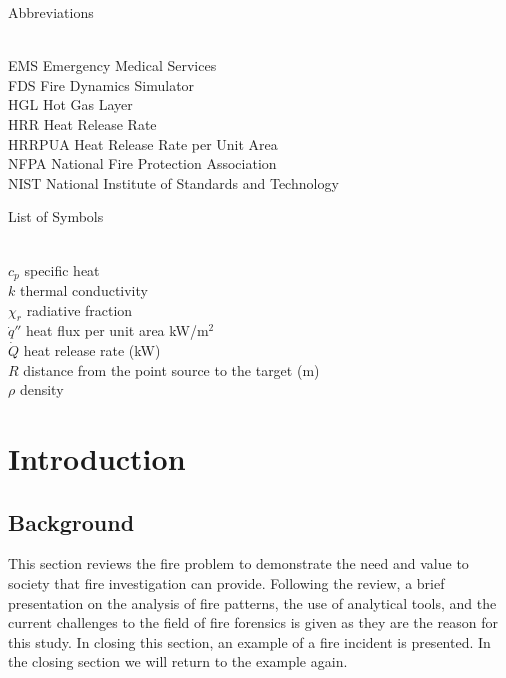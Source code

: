 \documentclass[twoside]{uocthesis}
\begin{document}
\clearpage
Abbreviations
\begin{tabbing}
\hspace{1.5in} \= \\
EMS \> Emergency Medical Services \\
FDS \> Fire Dynamics Simulator \\
HGL \> Hot Gas Layer \\
HRR \> Heat Release Rate \\
HRRPUA \> Heat Release Rate per Unit Area \\
NFPA \> National Fire Protection Association  \\
NIST \> National Institute of Standards and Technology \\
\end{tabbing}

List of Symbols
\begin{tabbing}
\hspace{1.5in} \= \\
$c_{p}$ \> specific heat \\
$k$ \> thermal conductivity \\
$\chi_r$ \> radiative fraction \\
$\dot{q}''$ \> heat flux per unit area kW/m$^2$ \\
$\dot{Q}$ \> heat release rate (kW) \\ 
$R$ \> distance from the point source to the target (m) \\
$\rho$ \> density \\
\end{tabbing}

\textpages

\chapter{Introduction}
\label{chapter:Introduction}
\section{Background}

This section reviews the fire problem to demonstrate the need and value to society that fire investigation can provide. Following the review, a brief presentation on the analysis  of fire patterns, the use of analytical tools, and the current challenges to the field of fire forensics is given as they are the reason for this study.  In closing this section, an example of a fire incident is presented. In the closing section we will return to the example again.   
\end{document}
